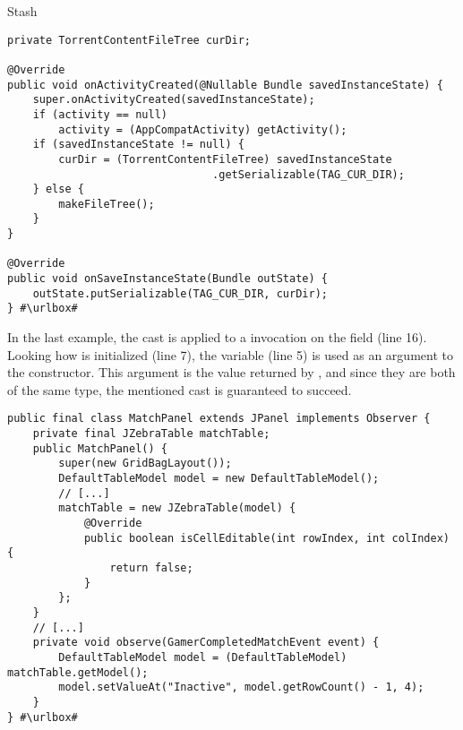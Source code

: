 \begin{pattern}{Stash}
\def\urlvar{http://bit.ly/proninyaroslav_libretorrent_2TxpZCM}
\begin{verbatim}
private TorrentContentFileTree curDir;

@Override
public void onActivityCreated(@Nullable Bundle savedInstanceState) {
    super.onActivityCreated(savedInstanceState);
    if (activity == null)
        activity = (AppCompatActivity) getActivity();
    if (savedInstanceState != null) {
        curDir = (TorrentContentFileTree) savedInstanceState
                                .getSerializable(TAG_CUR_DIR);
    } else {
        makeFileTree();
    }
}

@Override
public void onSaveInstanceState(Bundle outState) {
    outState.putSerializable(TAG_CUR_DIR, curDir);
} #\urlbox#
\end{verbatim}

In the last example,
the cast is applied to a  invocation on the  field (line 16).
Looking how  is initialized (line 7),
the  variable (line 5) is used as an argument to the constructor.
This argument is the value returned by ,
and since they are both of the same type,
the mentioned cast is guaranteed to succeed.

\def\urlvar{http://bit.ly/ggp_org_ggp_base_2SAEXHu}
\begin{verbatim}
public final class MatchPanel extends JPanel implements Observer {
    private final JZebraTable matchTable;
    public MatchPanel() {
        super(new GridBagLayout());
        DefaultTableModel model = new DefaultTableModel();
        // [...]
        matchTable = new JZebraTable(model) {
            @Override
            public boolean isCellEditable(int rowIndex, int colIndex) {
                return false;
            }
        };
    }
    // [...]
    private void observe(GamerCompletedMatchEvent event) {
        DefaultTableModel model = (DefaultTableModel) matchTable.getModel();
        model.setValueAt("Inactive", model.getRowCount() - 1, 4);
    }
} #\urlbox#
\end{verbatim}


\end{pattern}
